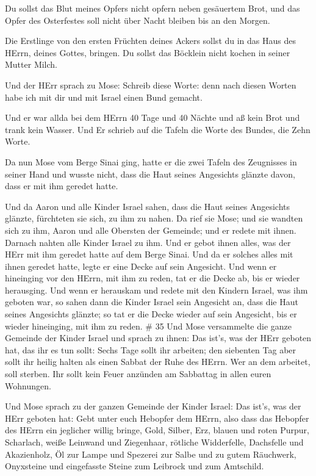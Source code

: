  Du sollst das Blut meines Opfers nicht opfern neben
gesäuertem Brot, und das Opfer des Osterfestes soll nicht über Nacht
bleiben bis an den Morgen.

 Die Erstlinge von den ersten Früchten deines Ackers sollst
du in das Haus des HErrn, deines Gottes, bringen. Du sollst das Böcklein
nicht kochen in seiner Mutter Milch.

 Und der HErr sprach zu Mose: Schreib diese Worte: denn
nach diesen Worten habe ich mit dir und mit Israel einen Bund gemacht.

 Und er war allda bei dem HErrn 40 Tage und 40 Nächte und
aß kein Brot und trank kein Wasser. Und Er schrieb auf die Tafeln die
Worte des Bundes, die Zehn Worte.

 Da nun Mose vom Berge Sinai ging, hatte er die zwei Tafeln
des Zeugnisses in seiner Hand und wusste nicht, dass die Haut seines
Angesichts glänzte davon, dass er mit ihm geredet hatte.

 Und da Aaron und alle Kinder Israel sahen, dass die Haut
seines Angesichts glänzte, fürchteten sie sich, zu ihm zu nahen.
 Da rief sie Mose; und sie wandten sich zu ihm, Aaron und
alle Obersten der Gemeinde; und er redete mit ihnen. 
Darnach nahten alle Kinder Israel zu ihm. Und er gebot ihnen alles, was
der HErr mit ihm geredet hatte auf dem Berge Sinai.  Und da
er solches alles mit ihnen geredet hatte, legte er eine Decke auf sein
Angesicht.  Und wenn er hineinging vor den HErrn, mit ihm
zu reden, tat er die Decke ab, bis er wieder herausging. Und wenn er
herauskam und redete mit den Kindern Israel, was ihm geboten war,
 so sahen dann die Kinder Israel sein Angesicht an, dass
die Haut seines Angesichts glänzte; so tat er die Decke wieder auf sein
Angesicht, bis er wieder hineinging, mit ihm zu reden. \# 35
 Und Mose versammelte die ganze Gemeinde der Kinder Israel
und sprach zu ihnen: Das ist's, was der HErr geboten hat, das ihr es tun
sollt:  Sechs Tage sollt ihr arbeiten; den siebenten Tag
aber sollt ihr heilig halten als einen Sabbat der Ruhe des HErrn. Wer an
dem arbeitet, soll sterben.  Ihr sollt kein Feuer anzünden
am Sabbattag in allen euren Wohnungen.

 Und Mose sprach zu der ganzen Gemeinde der Kinder Israel:
Das ist's, was der HErr geboten hat:  Gebt unter euch
Hebopfer dem HErrn, also dass das Hebopfer des HErrn ein jeglicher
willig bringe, Gold, Silber, Erz,  blauen und roten Purpur,
Scharlach, weiße Leinwand und Ziegenhaar,  rötliche
Widderfelle, Dachsfelle und Akazienholz,  Öl zur Lampe und
Spezerei zur Salbe und zu gutem Räuchwerk,  Onyxsteine und
eingefasste Steine zum Leibrock und zum Amtschild.

